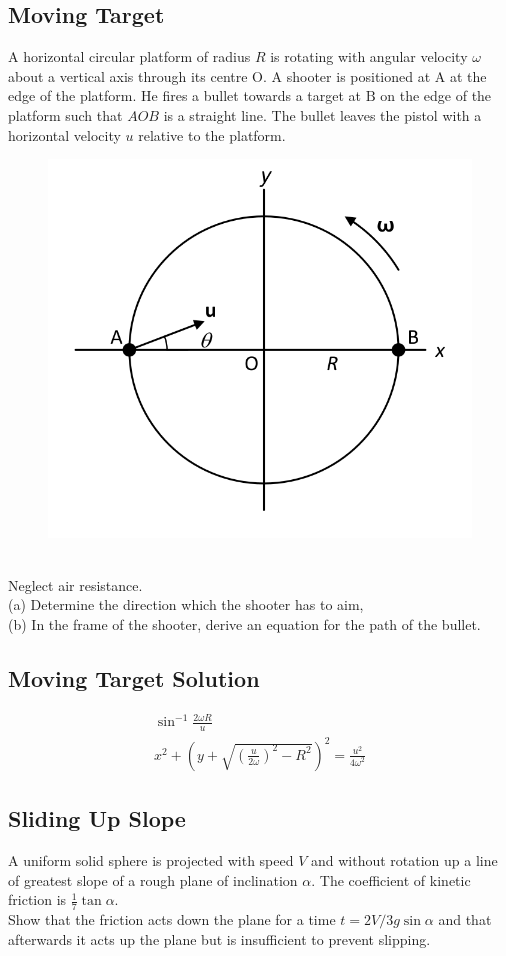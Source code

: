 \documentclass{article}
\begin{document}
\subsection{Moving Target }
A horizontal circular platform of radius $R$ is rotating with angular velocity $\omega$ about a vertical axis through its centre $\mathrm{O}$. A shooter is positioned at $\mathrm{A}$ at the edge of the platform. He fires a bullet towards a target at $\mathrm{B}$ on the edge of the platform such that $A O B$ is a straight line. The bullet leaves the pistol with a horizontal velocity $u$ relative to the platform.
\begin{figure}[h]
    \centering
\includegraphics[width=0.5\linewidth]{images/movingtarget.png}
\end{figure}\\
Neglect air resistance.\\
\noindent (a) Determine the direction which the shooter has to aim,\\
\noindent (b) In the frame of the shooter, derive an equation for the path of the bullet.

\clearpage
\subsection{Moving Target Solution}
\begin{align}
\sin ^{-1} \frac{2 \omega R}{u} \\
x^2+\left(y+\sqrt{\left(\frac{u}{2 \omega}\right)^2-R^2}\right)^2=\frac{u^2}{4 \omega^2}
\end{align}
\clearpage
\subsection{Sliding Up Slope }
A uniform solid sphere is projected with speed $V$ and without rotation up a line of greatest slope of a rough plane of inclination $\alpha$. The coefficient of kinetic friction is $\frac{1}{7} \tan \alpha$.\\[20pt]
Show that the friction acts down the plane for a time $t=2 V / 3 g \sin \alpha$ and that afterwards it acts up the plane but is insufficient to prevent slipping.
\clearpage
\end{document}
